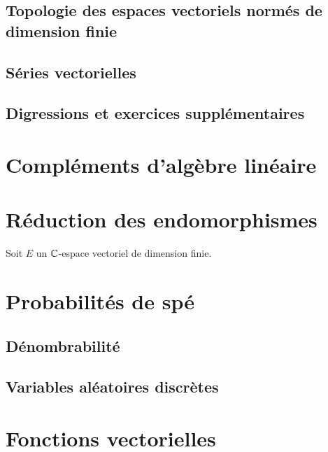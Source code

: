 \documentclass[12pt,a4paper]{exo_book}
\begin{document}
\section{Topologie des espaces vectoriels normés de dimension finie}

\section{Séries vectorielles}

\section{Digressions et exercices supplémentaires}


\chapter{Compléments d'algèbre linéaire}

\chapter{Réduction des endomorphismes}

\begin{exo}
    Soit $E$ un $\mathbb{C}$-espace vectoriel de dimension finie.
\end{exo}


\chapter{Probabilités de spé}

\section{Dénombrabilité}

\section{Variables aléatoires discrètes}


\chapter{Fonctions vectorielles}
\end{document}
